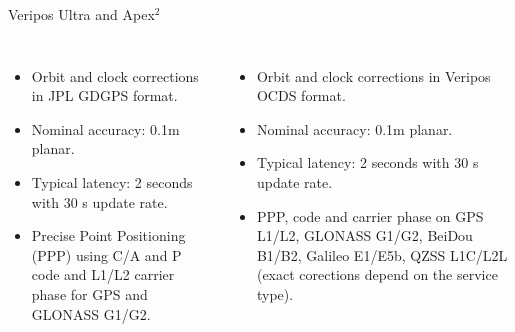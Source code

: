 \documentclass[11pt]{beamer}
\begin{document}
\begin{frame}{Veripos Ultra and Apex$^2$} %
	\begin{columns}[T,onlytextwidth]
		\begin{itemize}	
			\item Orbit and clock corrections in JPL GDGPS format.
			\item Nominal accuracy: 0.1m planar. 
			\item Typical latency: 2 seconds with 30 s update rate.%
			\item Precise Point Positioning (PPP) using C/A and P code and L1/L2 carrier phase for GPS and GLONASS G1/G2.
		\end{itemize}	
			\begin{itemize}
			\item Orbit and clock corrections in Veripos OCDS format.
			\item Nominal accuracy: 0.1m planar. 
			\item Typical latency: 2 seconds with 30 s update rate.%
			\item PPP, code and carrier phase on GPS L1/L2, GLONASS G1/G2, BeiDou B1/B2, Galileo E1/E5b, QZSS L1C/L2L (exact corections depend on the service type).
			\end{itemize}	
	\end{columns}
\end{frame}


\end{document}
